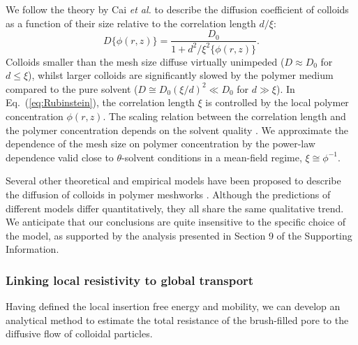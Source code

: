 \documentclass[12pt, a4paper]{article}
\begin{document}
We follow the theory by Cai \emph{et al.} \cite{Cai2011} to describe the diffusion coefficient of colloids as a function of their size relative to the correlation length $d / \xi$:
\begin{equation}
    D\{\phi(r,z)\} = \frac{D_0}{1+d^2/\xi^{2}\{\phi(r,z)\}}.
    \label{eq:Rubinstein}
\end{equation}
Colloids smaller than the mesh size diffuse virtually unimpeded ($D \approx D_0$ for $d\leq \xi$), whilst larger colloids are significantly slowed by the polymer medium compared to the pure solvent ($D\cong D_0 (\xi/d)^2\ll D_0$ for $d\gg \xi$).
In Eq.~(\ref{eq:Rubinstein}), the correlation length $\xi$ is controlled by the local polymer concentration $\phi(r,z)$.
The scaling relation between the correlation length and the polymer concentration depends on the solvent quality \cite{DeGennes1979}.
We approximate the dependence of the mesh size on polymer concentration by the power-law dependence valid close to $\theta$-solvent conditions in a mean-field regime, $\xi\cong \phi^{-1}$.

Several other theoretical and empirical models have been proposed to describe the diffusion of colloids in polymer meshworks \cite{Kohli2012,Holyst2009,Phillies1988}.
Although the predictions of different models differ quantitatively, they all share the same qualitative trend. We anticipate that our conclusions are quite insensitive to the specific choice of the model, as supported by the analysis presented in Section 9 of the Supporting Information.



\subsubsection{Linking local resistivity to global transport}


Having defined the local insertion free energy and mobility, we can develop an analytical method to estimate the total resistance of the brush-filled pore to the diffusive flow of colloidal particles.
\end{document}

